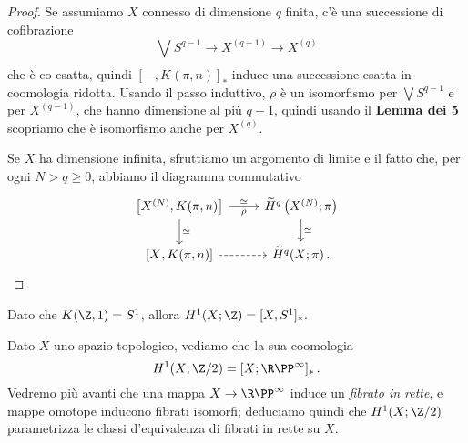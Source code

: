 \begin{thm}
\begin{proof}
		Se assumiamo $X$ connesso di dimensione $q$ finita, c'è una successione di cofibrazione
		\begin{equation*}
			\bigvee_{} S^{q-1} \longrightarrow X^{(q-1)} \longrightarrow X^{(q)}
		\end{equation*}
		che è co-esatta, quindi $[-,K(\pi,n)]_{\ast}$ induce una successione esatta in 
		coomologia ridotta. Usando il passo induttivo,
		$\rho$ è un isomorfismo per $\bigvee S^{q-1}$ e per $X^{(q-1)}$,
		che hanno dimensione al più $q-1$, quindi usando
		il \textbf{Lemma dei 5} scopriamo che è isomorfismo anche per $X^{(q)}$.
		
		Se $X$ ha dimensione infinita, sfruttiamo un argomento di limite
		e il fatto che, per ogni $N > q \ge 0$, abbiamo il diagramma commutativo
		\begin{equation*}
			\begin{tikzcd}
				{\left[ X^{(N)}, K(\pi,n) \right] } \ar[r, "\simeq", "\rho"'] \ar[d, "\simeq"]
				& {\widetilde{H}^{q}\left(X^{(N)};\pi\right)} \ar[d, "\simeq"] \\
				{\left[ X^{}, K(\pi,n) \right] } \ar[r, dashed]
				& \widetilde{H}^{q}(X;\pi)\,.
			\end{tikzcd}
		\end{equation*}
		\end{proof}
	\end{thm}
	
	\begin{ex}
		Dato che $K(\Z,1) = S^{1}$, allora $H^{1}(X;\Z) = [X,S^{1}]_{\ast}$.
	\end{ex}
	
	\begin{ex!}\label{line-bundle-spoiler}
		Dato $X$ uno spazio topologico, vediamo che la sua coomologia
		\begin{equation*}
			H^{1}(X;\Z/2) = [X;\R\PP^{\infty}]_{\ast}\,.
		\end{equation*}
		Vedremo più avanti che una mappa $X \to \R\PP^{\infty}$
		induce un \emph{fibrato in rette}, e mappe omotope
		inducono fibrati isomorfi; deduciamo quindi che 
		$H^{1}(X;\Z/2)$ parametrizza le classi d'equivalenza di fibrati in rette su $X$.
	\end{ex!}






